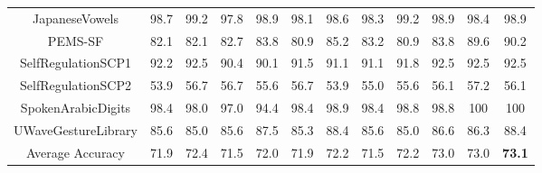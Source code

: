 \documentclass{article}
\begin{document}
\begin{table}[t!]
\begin{center}
{\begin{tabular}{cccccccccccc}
				\\
				JapaneseVowels                 
				& 98.7 & 99.2 & 97.8 & 98.9 & 98.1 & 98.6 & 98.3 & 99.2 & 98.9
				& 98.4 & 98.9             
				\\
				PEMS-SF                        
				& 82.1 & 82.1 & 82.7 & 83.8 & 80.9 & 85.2 & 83.2 & 80.9 & 83.8   
				& 89.6 & 90.2              
				\\
				SelfRegulationSCP1             
				& 92.2 & 92.5 & 90.4 & 90.1 & 91.5 & 91.1 & 91.1 & 91.8 & 92.5
				& 92.5 & 92.5              
				\\
				SelfRegulationSCP2             
				& 53.9 & 56.7 & 56.7 & 55.6 & 56.7 & 53.9 & 55.0 & 55.6 & 56.1
				& 57.2 & 56.1              
				\\
				SpokenArabicDigits             
				& 98.4 & 98.0 & 97.0 & 94.4 & 98.4 & 98.9 & 98.4 & 98.8 & 98.8
				& 100 & 100       
				\\
				UWaveGestureLibrary            
				& 85.6 & 85.0 & 85.6 & 87.5 & 85.3 & 88.4 & 85.6 & 85.0 & 86.6
				& 86.3& 88.4              
				\\ \midrule
				Average Accuracy               
				& 71.9 & 72.4 & 71.5 & 72.0 & 71.9 & 72.2 & 71.5 & 72.2 & 73.0
				& 73.0 & \bf{73.1}               
				\\ \bottomrule
		\end{tabular}}
	\end{center}
	\vspace{-5mm}
\end{table}
\end{document}
